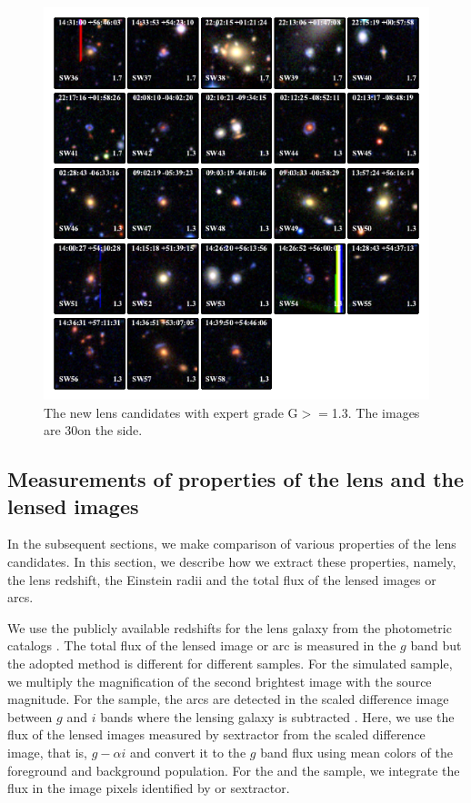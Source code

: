 \documentclass[useAMS,usenatbib,a4paper]{mn2e}
\begin{document}
\begin{figure}
\begin{center}
\includegraphics[scale=1.9]{sw-cfhtls-figs/lenscandfin_1.pdf}
\caption{ \label{fig:lc}
The new \sw lens candidates with expert grade G$>=$1.3. The images are
30\arcsec on the side.
}
\end{center}
\end{figure}

\subsection{Measurements of properties of the lens and the lensed images}
\label{sec:results:meas}

In the subsequent sections, we make comparison of various properties of the lens
candidates. In this section, we describe how we extract these properties, namely,
the lens redshift, the Einstein radii and the total flux of the lensed images or
arcs.

We use the publicly available redshifts for the lens galaxy from the
\cfhtls photometric catalogs \citep{Coupon2009}. The total flux of the
lensed image or arc is measured in the $g$ band but the adopted method
is different for different samples. For the simulated sample, we
multiply the magnification of the second brightest image with the source
magnitude. For the \rf sample, the arcs are detected in the scaled
difference image between $g$ and $i$ bands where the lensing galaxy is
subtracted \citep[for details, see]{Gavazzi2014}. Here, we use the flux
of the lensed images measured by {\sc sextractor} from the scaled
difference image, that is, $g-\alpha i$ and convert it to the $g$ band
flux using mean colors of the foreground and background population. For
the \af and the \sw sample, we integrate the flux in the image pixels
identified by \af or {\sc sextractor}.
\end{document}
